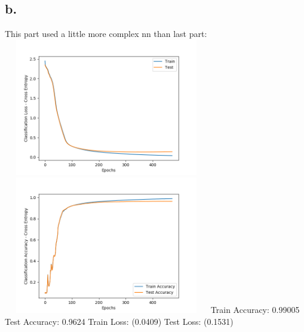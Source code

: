 \documentclass{article}
\begin{document}
\subsection*{b.}
This part used a little more complex nn than last part: \newline
\includegraphics[width=9cm, height=6cm]{plots/A5b_2.png} 
\includegraphics[width=9cm, height=6cm]{plots/A5b.png} \newline
Train Accuracy:  0.99005\newline
Test Accuracy:  0.9624\newline
Train Loss:  (0.0409)\newline
Test Loss:  (0.1531)\newline
\end{document}
